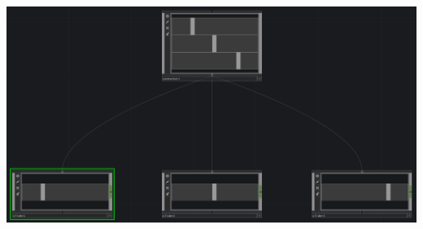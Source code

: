 \begin{fullwidth}
\begin{center} 
\includegraphics{./img/1.1/signal-flow-2.png}
\end{center}

\end{fullwidth}


